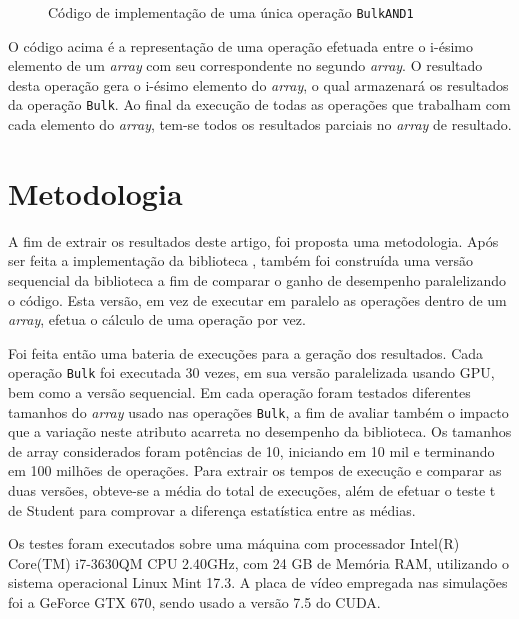 \documentclass[12pt]{article}
\begin{document}
\begin{figure}[!h]
\centering

\caption{Código de implementação de uma única operação \texttt{BulkAND1}}
\label{fig:bulkoperation}
\end{figure}

	O código acima é a representação de uma operação efetuada entre o i-ésimo elemento de um \textit{array} com seu correspondente no segundo \textit{array}. O resultado desta operação gera o i-ésimo elemento do \textit{array}, o qual armazenará os resultados da operação \texttt{Bulk}. Ao final da execução de todas as operações que trabalham com cada elemento do \textit{array}, tem-se todos os resultados parciais no \textit{array} de resultado.

\section{Metodologia}
\label{sec:metodologia}

	A fim de extrair os resultados deste artigo, foi proposta uma metodologia. Após ser feita a implementação da biblioteca \libname, também foi construída uma versão sequencial da biblioteca a fim de comparar o ganho de desempenho paralelizando o código. Esta versão, em vez de executar em paralelo as operações dentro de um \textit{array}, efetua o cálculo de uma operação por vez.
	
	Foi feita então uma bateria de execuções para a geração dos resultados. Cada operação \texttt{Bulk} foi executada 30 vezes, em sua versão paralelizada usando GPU, bem como a versão sequencial. Em cada operação foram testados diferentes tamanhos do \textit{array} usado nas operações \texttt{Bulk}, a fim de avaliar também o impacto que a variação neste atributo acarreta no desempenho da biblioteca. Os tamanhos de array considerados foram potências de 10, iniciando em 10 mil e terminando em 100 milhões de operações. Para extrair os tempos de execução e comparar as duas versões, obteve-se a média do total de execuções, além de efetuar o teste t de Student para comprovar a diferença estatística entre as médias.
	
	Os testes foram executados sobre uma máquina com processador Intel(R) Core(TM) i7-3630QM CPU 2.40GHz, com 24 GB de Memória RAM, utilizando o sistema operacional Linux Mint 17.3. A placa de vídeo empregada nas simulações foi a GeForce GTX 670, sendo usado a versão 7.5 do CUDA.
	
\end{document}
